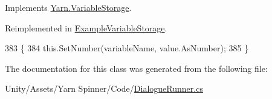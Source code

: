 Implements \hyperlink{a00088_aa90ff61224432c5ed3ce72199c55f440}{Yarn.\-Variable\-Storage}.



Reimplemented in \hyperlink{a00033_ac4265c1c9da485f13a6b05784b0f668d}{Example\-Variable\-Storage}.


\begin{DoxyCode}
383                                                                        \{
384             this.SetNumber(variableName, value.AsNumber);
385         \}
\end{DoxyCode}


The documentation for this class was generated from the following file\-:\begin{DoxyCompactItemize}
\item 
Unity/\-Assets/\-Yarn Spinner/\-Code/\hyperlink{a00105}{Dialogue\-Runner.\-cs}\end{DoxyCompactItemize}

